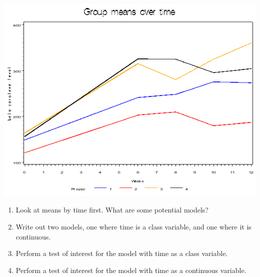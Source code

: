 \documentclass[
  9pt,
  ignorenonframetext,
]{beamer}
\providecommand{\tightlist}{%
  \setlength{\itemsep}{0pt}\setlength{\parskip}{0pt}}
\begin{document}
\begin{frame}{}
\protect\hypertarget{section-6}{}
\begin{center}\includegraphics[width=0.5\linewidth]{figs_L5/f6} \end{center}

\begin{enumerate}
\tightlist
\item
  Look at means by time first. What are some potential models?
\end{enumerate}

\vspace{\baselineskip}

\begin{enumerate}
\setcounter{enumi}{1}
\tightlist
\item
  Write out two models, one where time is a class variable, and one
  where it is continuous.
\end{enumerate}

\vspace{\baselineskip}

\begin{enumerate}
\setcounter{enumi}{2}
\tightlist
\item
  Perform a test of interest for the model with time as a class
  variable.
\end{enumerate}

\vspace{\baselineskip}

\begin{enumerate}
\setcounter{enumi}{3}
\tightlist
\item
  Perform a test of interest for the model with time as a continuous
  variable.
\end{enumerate}

\vspace{\baselineskip}
\end{frame}
\end{document}
